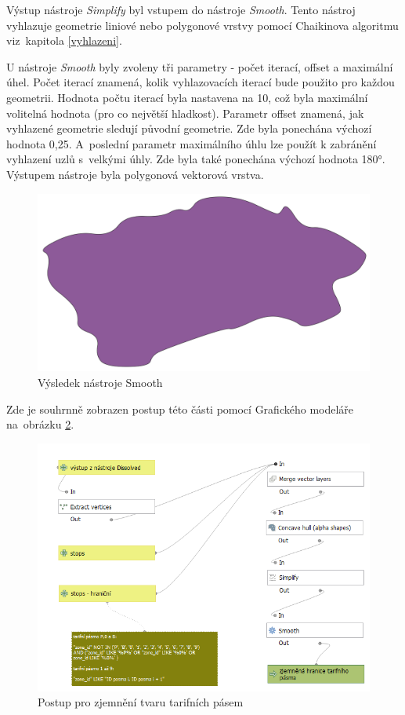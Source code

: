 Výstup nástroje \textit{Simplify} byl vstupem do nástroje \textit{Smooth}. Tento nástroj vy\-hlazuje geometrie
liniové nebo polygonové vrstvy pomocí Chaikinova algoritmu viz~ka\-pitola \ref{vyhlazeni}.

U nástroje \textit{Smooth} byly zvoleny tři parametry - počet iterací, offset a maximální úhel.
Počet iterací znamená, kolik vyhlazovacích iterací bude použito pro každou geometrii.
Hodnota počtu iterací byla nastavena na 10, což byla maximální volitelná hodnota (pro co největší hladkost).
Parametr offset znamená, jak  vyhlazené geometrie sledují původní geometrie.
Zde byla ponechána výchozí hodnota 0,25. A~poslední parametr maximálního úhlu lze použít
k zabránění vyhlazení uzlů s~velkými úhly. Zde byla také ponechána výchozí hodnota 180°.
Výstupem nástroje byla polygonová vektorová vrstva.

\begin{figure}[H] \centering
    \includegraphics[width=400pt]{./pictures/smooth-P0B.png}
    \caption[Výsledek nástroje Smooth]{Výsledek nástroje Smooth}
	\label{fig:smooth-P0B}                                
\end{figure}

Zde je souhrnně zobrazen postup této části pomocí Grafického modeláře na~obrá\-zku \ref{fig:postup-smooth}.

\begin{figure}[H] \centering
    \includegraphics[width=400pt]{./pictures/postup-smooth.png}
    \caption[Postup pro zjemnění tvaru tarifních pásem]{Postup pro zjemnění tvaru tarifních pásem}
	\label{fig:postup-smooth}              
\end{figure}

